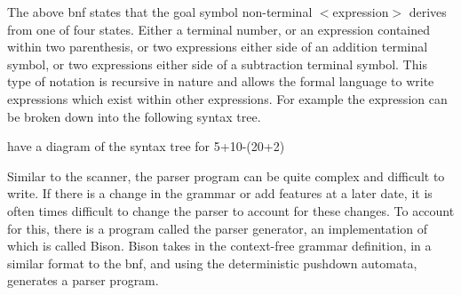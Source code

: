 The above \acrshort{bnf} states that the goal symbol non-terminal $<$expression$>$ derives from one of four states. Either a terminal number, or an expression contained within two parenthesis, or two expressions either side of an addition terminal symbol, or two expressions either side of a subtraction terminal symbol. This type of notation is recursive in nature and allows the formal language to write expressions which exist within other expressions. For example the expression  can be broken down into the following syntax tree. 

have a diagram of the syntax tree for 5+10-(20+2)

Similar to the scanner, the parser program can be quite complex and difficult to write. If there is a change in the grammar or add features at a later date, it is often times difficult to change the parser to account for these changes. To account for this, there is a program called the parser generator, an implementation of which is called Bison. Bison takes in the context-free grammar definition, in a similar format to the \acrshort{bnf}, and using the deterministic pushdown automata, generates a parser program.

